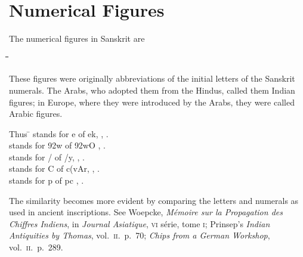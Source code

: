 
\section{Numerical Figures}

\s The numerical figures in Sanskrit are

\begin{tabbing}
  \centering
  \dnnum
  {\dn {}}\hspace*{2em}\=%
  {\dn {}}\hspace*{2em}\=%
  {\dn {}}\hspace*{2em}\=%
  {\dn {}}\hspace*{2em}\=%
  {\dn {}}\hspace*{2em}\=%
  {\dn {}}\hspace*{2em}\=%
  {\dn {}}\hspace*{2em}\=%
  {\dn {}}\hspace*{2em}\=%
  {\dn {}}\hspace*{2em}\=%
  {\dn {}}\hspace*{2em}\\
           
\end{tabbing}

\begin{note}
  These figures were originally abbreviations of the initial letters of
  the Sanskrit numerals. The Arabs, who adopted them from the Hindus,
  called them Indian figures; in Europe, where they were introduced by
  the Arabs, they were called Arabic figures.

  \begin{tabbing}
    \hspace*{2em}Thus \={\dn {}} stands for {\dn e}  of {\dn ek,} ,
    .\\
     stands for {\dn \392w}  of {\dn \392wO} , .\\
     stands for {\dn /}  of {\dn /y,} ,
    .\\
     stands for {\dn C}  of {\dn c(vAr,} ,
    .\\
     stands for {\dn p}  of {\dn p\2c} , .
  \end{tabbing}

  The similarity becomes more evident by comparing the letters and
  numerals as used in ancient inscriptions. See Woepcke, \emph{Mémoire
    sur la Propagation des Chiffres Indiens}, in \emph{Journal
    Asiatique}, \textsc{vi} série, tome \textsc{i}; Prinsep's
  \emph{Indian Antiquities by Thomas}, vol.\ \textsc{ii}.\ p.\ 70;
  \emph{Chips from a German Workshop}, vol.\ \textsc{ii}.\ p.\ 289.
\end{note}

